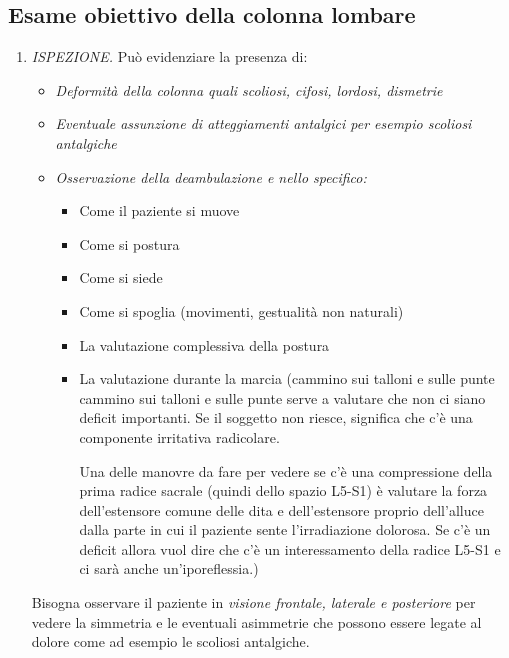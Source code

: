 \subsection{Esame obiettivo della colonna lombare}


\begin{enumerate}
\def\labelenumi{\arabic{enumi}.}
\item
  \emph{ISPEZIONE.} Può evidenziare la presenza di:

\begin{itemize}
\item
  \emph{Deformità della colonna quali scoliosi, cifosi, lordosi,
  dismetrie}
\item
  \emph{Eventuale assunzione di atteggiamenti antalgici per esempio
  scoliosi antalgiche}
\item
  \emph{Osservazione della deambulazione e nello specifico:}

\begin{itemize}
\item
  Come il paziente si muove
\item
  Come si postura
\item
  Come si siede
\item
  Come si spoglia (movimenti, gestualità non naturali)
\item
  La valutazione complessiva della postura
\item 
La valutazione durante la marcia (cammino sui talloni e sulle punte cammino sui talloni e sulle punte serve a valutare che non ci siano deficit importanti. Se il soggetto non riesce, significa
che c'è una componente irritativa radicolare.

Una delle manovre da fare per vedere se c'è una compressione della prima
radice sacrale (quindi dello spazio L5-S1) è valutare la forza
dell'estensore comune delle dita e dell'estensore proprio dell'alluce
dalla parte in cui il paziente sente l'irradiazione dolorosa. Se c'è un
deficit allora vuol dire che c'è un interessamento della radice L5-S1 e
ci sarà anche un'iporeflessia.)
\end{itemize}
\end{itemize}


 

Bisogna osservare il paziente in \emph{visione frontale, laterale e
posteriore} per vedere la simmetria e le eventuali asimmetrie che
possono essere legate al dolore come ad esempio le scoliosi antalgiche.


\end{enumerate}
